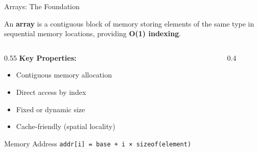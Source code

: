 \documentclass[aspectratio=169,xcolor=dvipsnames]{beamer}
\begin{document}
\begin{frame}{Arrays: The Foundation}
  \begin{definition}
    An \textbf{array} is a contiguous block of memory storing elements of the same type in sequential memory locations, providing \textbf{O(1) indexing}.
  \end{definition}

  \vspace{0.3cm}

  \begin{columns}
    \begin{column}{0.55\textwidth}
      \textbf{Key Properties:}
      \begin{itemize}
        \item Contiguous memory allocation
        \item Direct access by index
        \item Fixed or dynamic size
        \item Cache-friendly (spatial locality)
      \end{itemize}

      \vspace{0.3cm}

      \begin{exampleblock}{Memory Address}
        \texttt{addr[i] = base + i × sizeof(element)}
      \end{exampleblock}
    \end{column}
    \begin{column}{0.4\textwidth}
    \end{column}
  \end{columns}
\end{frame}
\end{document}
